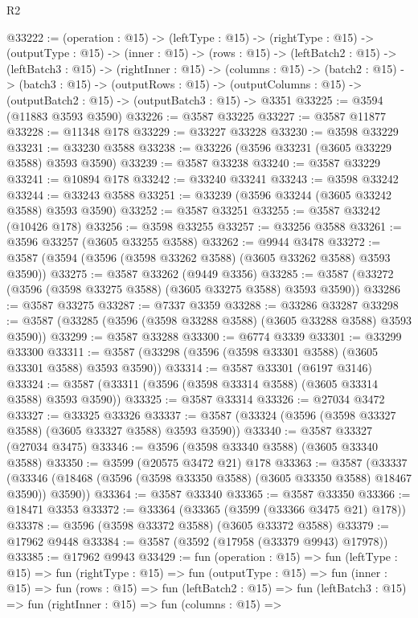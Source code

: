 \begin{lexlean}{R2}
\begin{coremodule}
@33222 := (operation : @15) ->
  (leftType : @15) ->
  (rightType : @15) ->
  (outputType : @15) ->
  (inner : @15) ->
  (rows : @15) ->
  (leftBatch2 : @15) ->
  (leftBatch3 : @15) ->
  (rightInner : @15) ->
  (columns : @15) ->
  (batch2 : @15) ->
  (batch3 : @15) ->
  (outputRows : @15) ->
  (outputColumns : @15) -> (outputBatch2 : @15) -> (outputBatch3 : @15) -> @3351
@33225 := @3594 (@11883 @3593 @3590)
@33226 := @3587 @33225
@33227 := @3587 @11877
@33228 := @11348 @178
@33229 := @33227 @33228
@33230 := @3598 @33229
@33231 := @33230 @3588
@33238 := @33226 (@3596 @33231 (@3605 @33229 @3588) @3593 @3590)
@33239 := @3587 @33238
@33240 := @3587 @33229
@33241 := @10894 @178
@33242 := @33240 @33241
@33243 := @3598 @33242
@33244 := @33243 @3588
@33251 := @33239 (@3596 @33244 (@3605 @33242 @3588) @3593 @3590)
@33252 := @3587 @33251
@33255 := @3587 @33242 (@10426 @178)
@33256 := @3598 @33255
@33257 := @33256 @3588
@33261 := @3596 @33257 (@3605 @33255 @3588)
@33262 := @9944 @3478
@33272 := @3587 (@3594 (@3596 (@3598 @33262 @3588) (@3605 @33262 @3588) @3593 @3590))
@33275 := @3587 @33262 (@9449 @3356)
@33285 := @3587 (@33272 (@3596 (@3598 @33275 @3588) (@3605 @33275 @3588) @3593 @3590))
@33286 := @3587 @33275
@33287 := @7337 @3359
@33288 := @33286 @33287
@33298 := @3587 (@33285 (@3596 (@3598 @33288 @3588) (@3605 @33288 @3588) @3593 @3590))
@33299 := @3587 @33288
@33300 := @6774 @3339
@33301 := @33299 @33300
@33311 := @3587 (@33298 (@3596 (@3598 @33301 @3588) (@3605 @33301 @3588) @3593 @3590))
@33314 := @3587 @33301 (@6197 @3146)
@33324 := @3587 (@33311 (@3596 (@3598 @33314 @3588) (@3605 @33314 @3588) @3593 @3590))
@33325 := @3587 @33314
@33326 := @27034 @3472
@33327 := @33325 @33326
@33337 := @3587 (@33324 (@3596 (@3598 @33327 @3588) (@3605 @33327 @3588) @3593 @3590))
@33340 := @3587 @33327 (@27034 @3475)
@33346 := @3596 (@3598 @33340 @3588) (@3605 @33340 @3588)
@33350 := @3599 (@20575 @3472 @21) @178
@33363 := @3587
    (@33337 (@33346 (@18468 (@3596 (@3598 @33350 @3588) (@3605 @33350 @3588) @18467 @3590)) @3590))
@33364 := @3587 @33340
@33365 := @3587 @33350
@33366 := @18471 @3353
@33372 := @33364 (@33365 (@3599 (@33366 @3475 @21) @178))
@33378 := @3596 (@3598 @33372 @3588) (@3605 @33372 @3588)
@33379 := @17962 @9448
@33384 := @3587 (@3592 (@17958 (@33379 @9943) @17978))
@33385 := @17962 @9943
@33429 := fun (operation : @15) =>
  fun (leftType : @15) =>
  fun (rightType : @15) =>
  fun (outputType : @15) =>
  fun (inner : @15) =>
  fun (rows : @15) =>
  fun (leftBatch2 : @15) =>
  fun (leftBatch3 : @15) =>
  fun (rightInner : @15) =>
  fun (columns : @15) =>

\end{coremodule}
\end{lexlean}
